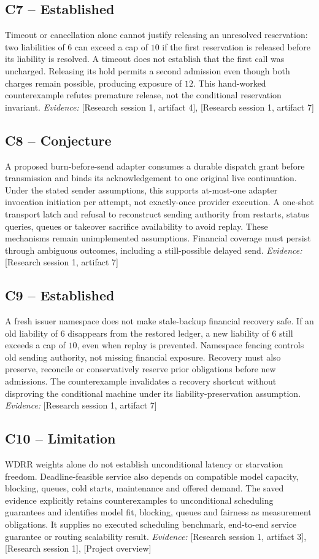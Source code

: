 \documentclass[11pt]{article}
\begin{document}
\subsection{C7 -- Established}
Timeout or cancellation alone cannot justify releasing an unresolved reservation: two liabilities of $6$ can exceed a cap of $10$ if the first reservation is released before its liability is resolved.
A timeout does not establish that the first call was uncharged. Releasing its hold permits a second admission even though both charges remain possible, producing exposure of $12$. This hand-worked counterexample refutes premature release, not the conditional reservation invariant.
\textit{Evidence: }[Research session 1, artifact 4], [Research session 1, artifact 7]
\subsection{C8 -- Conjecture}
A proposed burn-before-send adapter consumes a durable dispatch grant before transmission and binds its acknowledgement to one original live continuation. Under the stated sender assumptions, this supports at-most-one adapter invocation initiation per attempt, not exactly-once provider execution.
A one-shot transport latch and refusal to reconstruct sending authority from restarts, status queries, queues or takeover sacrifice availability to avoid replay. These mechanisms remain unimplemented assumptions. Financial coverage must persist through ambiguous outcomes, including a still-possible delayed send.
\textit{Evidence: }[Research session 1, artifact 7]
\subsection{C9 -- Established}
A fresh issuer namespace does not make stale-backup financial recovery safe. If an old liability of $6$ disappears from the restored ledger, a new liability of $6$ still exceeds a cap of $10$, even when replay is prevented.
Namespace fencing controls old sending authority, not missing financial exposure. Recovery must also preserve, reconcile or conservatively reserve prior obligations before new admissions. The counterexample invalidates a recovery shortcut without disproving the conditional machine under its liability-preservation assumption.
\textit{Evidence: }[Research session 1, artifact 7]
\subsection{C10 -- Limitation}
WDRR weights alone do not establish unconditional latency or starvation freedom. Deadline-feasible service also depends on compatible model capacity, blocking, queues, cold starts, maintenance and offered demand.
The saved evidence explicitly retains counterexamples to unconditional scheduling guarantees and identifies model fit, blocking, queues and fairness as measurement obligations. It supplies no executed scheduling benchmark, end-to-end service guarantee or routing scalability result.
\textit{Evidence: }[Research session 1, artifact 3], [Research session 1], [Project overview]
\end{document}
